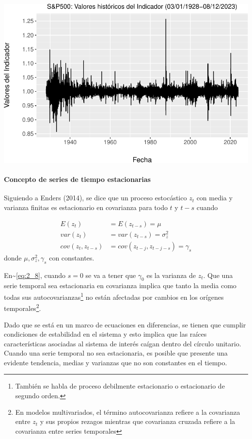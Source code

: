 \documentclass[
  oneside]{article}
\begin{document}
\includegraphics{Entrega_Laura_Montaldo_files/figure-latex/unnamed-chunk-13-1.pdf}

\hypertarget{concepto-de-series-de-tiempo-estacionarias}{%
\paragraph{Concepto de series de tiempo
estacionarias}\label{concepto-de-series-de-tiempo-estacionarias}}

Siguiendo a Enders (2014), se dice que un proceso estocástico \(z_{t}\)
con media y varianza finitas es estacionario en covarianza para todo
\(t\) y \(t-s\) cuando

\begin{align}
    \label{eq:2_7}
    E(z_{t})&=E(z_{t-s})=\mu\\
    \label{eq:2_8}
    var(z_t)&=var(z_{t-s})=\sigma^2_z\\
    \label{eq:2_9}
    cov(z_t,z_{t-s})&=cov(z_{t-j},z_{t-j-s})=\gamma_s
\end{align} donde \(\mu, \sigma^2_z, \gamma_s\) con constantes.

En\textasciitilde{}\eqref{eq:2_8}, cuando \(s=0\) se va a tener que
\(\gamma_0\) es la varianza de \(z_t\). Que una serie temporal sea
estacionaria en covarianza implica que tanto la media como todas sus
autocovarianzas\footnote{También se habla de proceso debilmente estacionario o estacionario de segundo orden.}
no están afectadas por cambios en los orígenes
temporales\footnote{En modelos multivariados, el término autocovarianza refiere a la covarianza entre $z_t$ y sus propios rezagos mientras que covarianza cruzada refiere a la covarianza entre series temporales}.

Dado que se está en un marco de ecuaciones en diferencias, se tienen que
cumplir condiciones de estabilidad en el sistema y esto implica que las
raíces características asociadas al sistema de interés caígan dentro del
círculo unitario. Cuando una serie temporal no sea estacionaria, es
posible que presente una evidente tendencia, medias y varianzas que no
son constantes en el tiempo.
\end{document}
